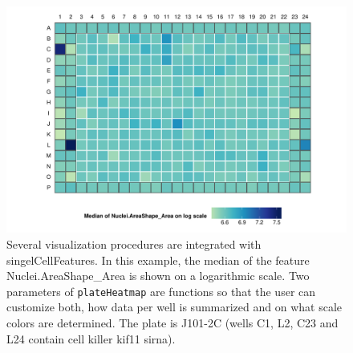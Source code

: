 \begin{knitrout}
\color{fgcolor}\begin{figure}

{\centering \includegraphics[width=.95\linewidth]{figures/R/heatmap-demo-scf-heatmap-1} 

}

\caption[An example heatmap plot as produced by \texttt{plateHeatmap}.]{Several visualization procedures are integrated with singelCellFeatures. In this example, the median of the feature Nuclei.AreaShape\_Area is shown on a logarithmic scale. Two parameters of \texttt{plateHeatmap} are functions so that the user can customize both, how data per well is summarized and on what scale colors are determined. The plate is J101-2C (wells C1, L2, C23 and L24 contain cell killer \gls{kif11} \gls{sirna}).}\label{fig:scf-heatmap}
\end{figure}


\end{knitrout}
